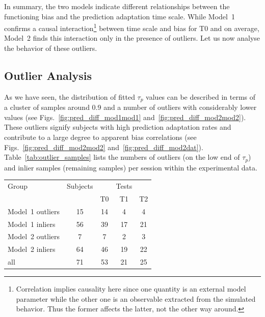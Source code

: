 \documentclass[a4paper]{scrreprt}
\begin{document}
In summary, the two models indicate different relationships between the functioning bias and the prediction adaptation time scale. While Model~1 confirms a causal interaction\footnote{Correlation implies causality here since one quantity is an external model parameter while the other one is an observable extracted from the simulated behavior. Thus the former affects the latter, not the other way around.} between time scale and bias for T0 and on average, Model~2 finds this interaction only in the presence of outliers. Let us now analyse the behavior of these outliers.


\subsection{Outlier Analysis}
\label{sec:outliers}

As we have seen, the distribution of fitted $\tau_p$ values can be described in terms of a cluster of samples around 0.9 and a number of outliers with considerably lower values (see Figs.~\ref{fig:pred_diff_mod1mod1} and~\ref{fig:pred_diff_mod2mod2}). These outliers signify subjects with high prediction adaptation rates and contribute to a large degree to apparent bias correlations (see Figs.~\ref{fig:pred_diff_mod2mod2} and~\ref{fig:pred_diff_mod2dat}). Table~\ref{tab:outlier_samples} lists the numbers of outliers (on the low end of $\tau_p$)  and inlier samples (remaining samples) per session within the experimental data.

\begin{center}
\begin{tabular}{ l  c  c  c  c }
\hline
Group & Subjects & & Tests & \\
&&T0 & T1 & T2\\
\hline
Model~1 outliers & 15 & 14 & 4 & 4\\
Model~1 inliers & 56 & 39 & 17 & 21\\
\hline
Model~2 outliers & 7 & 7 & 2 & 3\\
Model~2 inliers & 64 & 46 & 19 & 22\\
\hline
all & 71 & 53 & 21 & 25\\
\hline
\end{tabular}
\label{tab:outlier_samples}
\end{center}
\end{document}
